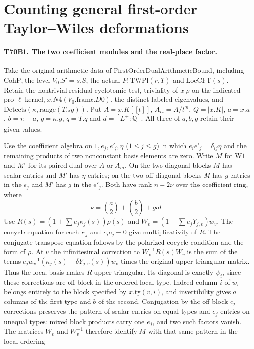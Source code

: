 \section{Counting general first-order Taylor--Wiles deformations}

\paragraph{T70B1. The two coefficient modules and the real-place factor.}
Take the original arithmetic data of
$\mathrm{FirstOrderDualArithmeticBound}$, including $\mathrm{CohP}$,
the level $V_0.S'=s.S$, the actual $P:\mathrm{TWPl}(r,T)$ and
$\mathrm{LocCFT}(s)$. Retain the nontrivial residual cyclotomic
test, triviality of $x.\rho$ on the indicated pro-$\ell$ kernel,
$x.N4(V_0.\mathrm{frame}.D0)$, the distinct labeled eigenvalues,
and $\mathrm{Detects}(\kappa,\mathrm{range}(T.sg))$. Put
$A=x.K[[t]]$, $A_m=A/t^m$, $Q=|x.K|$, $a=x.a$,
$b=n-a$, $g=\kappa.g$, $q=T.q$ and $d=[L^+:\mathbb Q]$.
All three of $a,b,g$ retain their given values.

Use the coefficient algebra on $1,e_j,e'_j,\eta$ ($1\le j\le g$)
in which $e_i e'_j=\delta_{ij}\eta$ and the remaining products
of two nonconstant basis elements are zero. Write $M$ for
$\mathrm{W1}$ and $M'$ for its paired dual over $A$ or $A_m$.
On the two diagonal blocks $M$ has scalar entries and $M'$ has
$\eta$ entries; on the two off-diagonal blocks $M$ has $g$ entries
in the $e_j$ and $M'$ has $g$ in the $e'_j$. Both have rank
$n+2\nu$ over the coefficient ring, where
\[
       \nu=\binom a2+\binom b2+gab.
\]
Use $R(s)=(1+\sum e_j\kappa_j(s))\rho(s)$ and
$W_v=(1-\sum e_jY_{j,v})w_v$. The cocycle equation for each
$\kappa_j$ and $e_i e_j=0$ give multiplicativity of $R$.
The conjugate-transpose equation follows by the polarized cocycle
condition and the form of $\rho$. At $v$ the infinitesimal
correction to $W_v^{-1}R(s)W_v$ is the sum of the terms
$e_j w_v^{-1}(\kappa_j(s)-\delta Y_{j,v}(s))w_v$ times the
original upper triangular matrix. Thus the local basis makes
$R$ upper triangular. Its diagonal is exactly $\psi_i$, since
these corrections are off block in the ordered local type.
Indeed column $i$ of $w_v$ belongs entirely to the block
specified by $x.\mathrm{ty}(v,i)$, and invertibility gives $a$
columns of the first type and $b$ of the second. Conjugation
by the off-block $e_j$ corrections preserves the pattern of
scalar entries on equal types and $e_j$ entries on unequal
types: mixed block products carry one $e_j$, and two such
factors vanish. The matrices $W_v$ and $W_v^{-1}$ therefore
identify $M$ with that same pattern in the local ordering.

